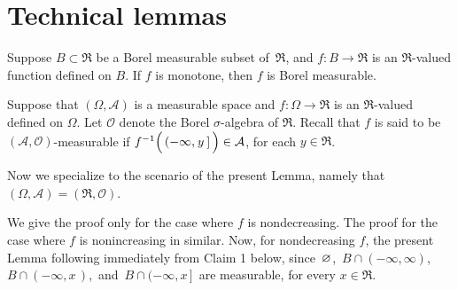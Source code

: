 

\section{Technical lemmas}
\setcounter{theorem}{0}
\setcounter{equation}{0}


\renewcommand{\theenumi}{\roman{enumi}}
\renewcommand{\labelenumi}{\textnormal{(\theenumi)}$\;\;$}


\begin{lemma}\label{lemma:MonotoneFunctionsAreMeasurable}
\mbox{}\vskip 0.1cm
\noindent
Suppose $B \subset \Re$ be a Borel measurable subset of \,$\Re$, and
$f : B \longrightarrow \Re$ is an $\Re$-valued function defined on $B$.
If $f$ is monotone, then $f$ is Borel measurable.
\end{lemma}
\proof
Suppose that $(\Omega,\mathcal{A})$ is a measurable space and
$f : \Omega \longrightarrow \Re$ is an $\Re$-valued defined on $\Omega$.
Let $\mathcal{O}$ denote the Borel $\sigma$-algebra of $\Re$.
Recall that $f$ is said to be $(\mathcal{A},\mathcal{O})$-measurable if
$f^{-1}\!\left(\,(-\infty,\overset{{\color{white}-}}{y}\,]\,\right) \in \mathcal{A}$,
for each $y \in \Re$.

\vskip 0.3cm
\noindent
Now we specialize to the scenario of the present Lemma, namely that
$(\Omega,\mathcal{A}) = (\Re,\mathcal{O})$.

\vskip 0.3cm
\noindent
We give the proof only for the case where $f$ is nondecreasing.
The proof for the case where $f$ is nonincreasing in similar.
Now, for nondecreasing $f$, the present Lemma following immediately
from Claim 1 below, since \,$\varnothing$, \,$B \cap (-\infty,\infty)$,
\,$B \cap (-\infty,x\,)$,\, and \,$B \cap (-\infty,x\,]$\, are measurable, for every $x\in\Re$.


